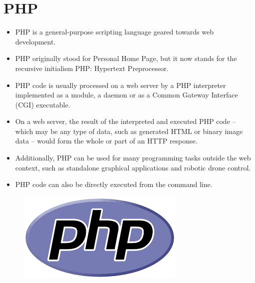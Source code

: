 \documentclass{article}
\begin{document}
\section*{PHP}
\begin{itemize}
	\item PHP is a general-purpose scripting language geared towards web development.
	\item PHP originally stood for Personal Home Page, but it now stands for the recursive initialism PHP: Hypertext Preprocessor.
	\item PHP code is usually processed on a web server by a PHP interpreter implemented as a module, a daemon or as a Common Gateway Interface (CGI) executable. 
	\item On a web server, the result of the interpreted and executed PHP code – which may be any type of data, such as generated HTML or binary image data – would form the whole or part of an HTTP response.
	\item Additionally, PHP can be used for many programming tasks outside the web context, such as standalone graphical applications and robotic drone control. 
	\item PHP code can also be directly executed from the command line.	
\end{itemize}
\begin{figure}
		\begin{center}
	\includegraphics[width=0.3\linewidth]{php.png}
\end{center}
\end{figure}
\newpage
\pagecolor{black}
\color{white}
\end{document}
